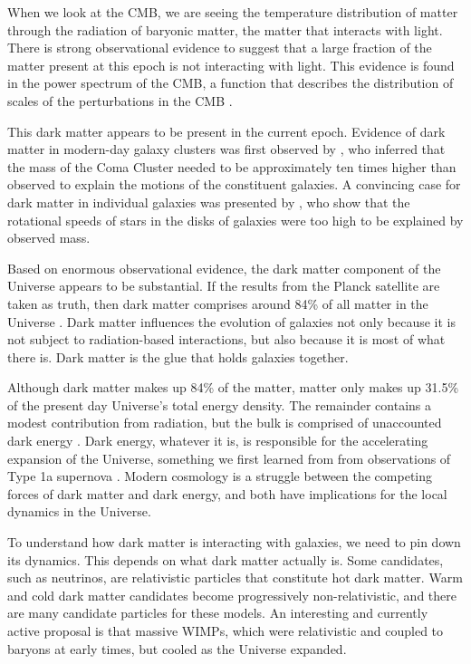 When we look at the CMB, we are seeing the temperature distribution of matter through the radiation of baryonic matter, the matter that interacts with light. There is strong observational evidence to suggest that a large fraction of the matter present at this epoch is not interacting with light. This evidence is found in the power spectrum of the CMB, a function that describes the distribution of scales of the perturbations in the CMB \citep{transfer_fn}. 

This dark matter appears to be present in the current epoch. Evidence of dark matter in modern-day galaxy clusters was first observed by \citet{zwicky_1933}, who inferred that the mass of the Coma Cluster needed to be approximately ten times higher than observed to explain the motions of the constituent galaxies. A convincing case for dark matter in individual galaxies was presented by \citet{rubin_1980}, who show that the rotational speeds of stars in the disks of galaxies were too high to be explained by observed mass.

Based on enormous observational evidence, the dark matter component of the Universe appears to be substantial. If the results from the Planck satellite are taken as truth, then dark matter comprises around 84\% of all matter in the Universe \citep{planck_2018}. Dark matter influences the evolution of galaxies not only because it is not subject to radiation-based interactions, but also because it is most of what there is. Dark matter is the glue that holds galaxies together.  

Although dark matter makes up 84\% of the matter, matter only makes up 31.5\% of the present day Universe's total energy density. The remainder contains a modest contribution from radiation, but the bulk is comprised of unaccounted dark energy \citep{kolb_turner,dodelson, BT}. Dark energy, whatever it is, is responsible for the accelerating expansion of the Universe, something we first learned from from observations of Type 1a supernova \citep{reiss_1998,perlmutter_1999}. Modern cosmology is a struggle between the competing forces of dark matter and dark energy, and both have implications for the local dynamics in the Universe.

To understand how dark matter is interacting with galaxies, we need to pin down its dynamics. This depends on what dark matter actually is. Some candidates, such as neutrinos, are relativistic particles that constitute hot dark matter. Warm and cold dark matter candidates become progressively non-relativistic, and there are many candidate particles for these models. An interesting and currently active proposal is that massive WIMPs, which were relativistic and coupled to baryons at early times, but cooled as the Universe expanded.

